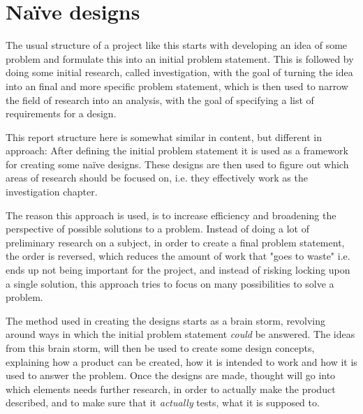 \section{Naïve designs}
The usual structure of a project like this starts with developing an idea of some problem and formulate this into an initial problem statement. This is followed by doing some initial research, called investigation, with the goal of turning the idea into an final and more specific problem statement, which is then used to narrow the field of research into an analysis, with the goal of specifying a list of requirements for a design.

This report structure here is somewhat similar in content, but different in approach:
After defining the initial problem statement it is used as a framework for creating some naïve designs. These designs are then used to figure out which areas of research should be focused on, i.e. they effectively work as the investigation chapter.
\bigskip

The reason this approach is used, is to increase efficiency and broadening the perspective of possible solutions to a problem. Instead of doing a lot of preliminary research on a subject, in order to create a final problem statement, the order is reversed, which reduces the amount of work that "goes to waste" i.e. ends up not being important for the project, and instead of risking locking upon a single solution, this approach tries to focus on many possibilities to solve a problem.

The method used in creating the designs starts as a brain storm, revolving around ways in which the initial problem statement \textit{could} be answered. The ideas from this brain storm, will then be used to create some design concepts, explaining how a product can be created, how it is intended to work and how it is used to answer the problem. Once the designs are made, thought will go into which elements needs further research, in order to actually make the product described, and to make sure that it \textit{actually} tests, what it is supposed to.


